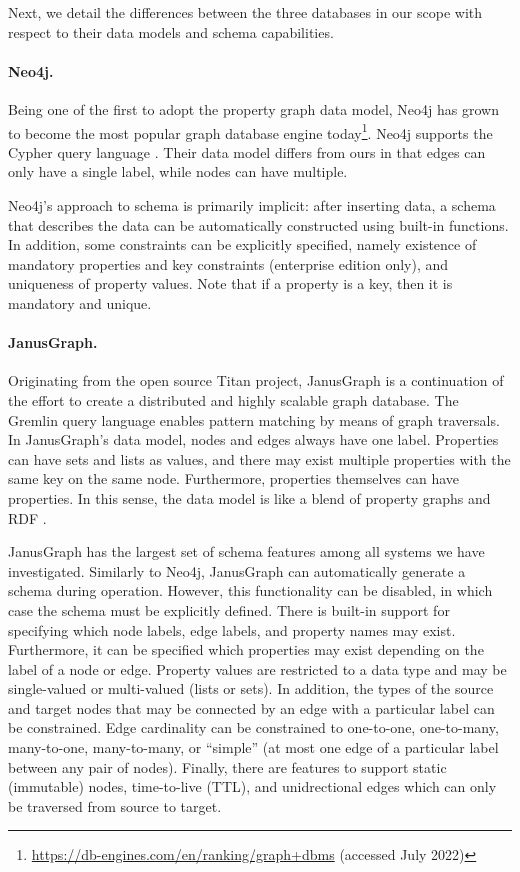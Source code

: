 \documentclass{report}
\theoremstyle{definition}
\begin{document}
Next, we detail the differences between the three databases in our scope with respect to their data models and schema capabilities.

\paragraph{Neo4j.} Being one of the first to adopt the property graph data model, Neo4j has grown to become the most popular graph database engine today\footnote{\url{https://db-engines.com/en/ranking/graph+dbms} (accessed July 2022)}. Neo4j supports the Cypher query language \citep{francis2018cypher}. Their data model differs from ours in that edges can only have a single label, while nodes can have multiple.

Neo4j's approach to schema is primarily implicit: after inserting data, a schema that describes the data can be automatically constructed using built-in functions. In addition, some constraints can be explicitly specified, namely existence of mandatory properties and key constraints (enterprise edition only), and uniqueness of property values. Note that if a property is a key, then it is mandatory and unique.

\paragraph{JanusGraph.} Originating from the open source Titan project, JanusGraph is a continuation of the effort to create a distributed and highly scalable graph database. The Gremlin query language \citep{rodriguez2015gremlin} enables pattern matching by means of graph traversals. In JanusGraph's data model, nodes and edges always have one label. Properties can have sets and lists as values, and there may exist multiple properties with the same key on the same node. Furthermore, properties themselves can have properties. In this sense, the data model is like a blend of property graphs and RDF \citep{pan2009rdf}.

JanusGraph has the largest set of schema features among all systems we have investigated. Similarly to Neo4j, JanusGraph can automatically generate a schema during operation. However, this functionality can be disabled, in which case the schema must be explicitly defined. There is built-in support for specifying which node labels, edge labels, and property names may exist. Furthermore, it can be specified which properties may exist depending on the label of a node or edge. Property values are restricted to a data type and may be single-valued or multi-valued (lists or sets). In addition, the types of the source and target nodes that may be connected by an edge with a particular label can be constrained. Edge cardinality can be constrained to one-to-one, one-to-many, many-to-one, many-to-many, or ``simple'' (at most one edge of a particular label between any pair of nodes). Finally, there are features to support static (immutable) nodes, time-to-live (TTL), and unidrectional edges which can only be traversed from source to target.
\end{document}
